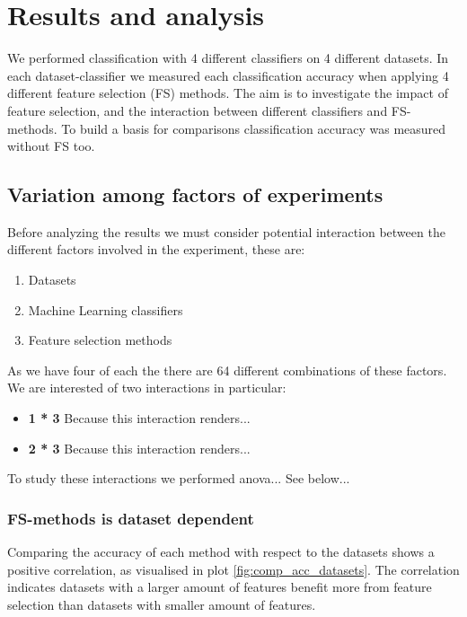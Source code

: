 \chapter{Results and analysis}

We performed classification with 4 different classifiers on 4 different datasets. In each dataset-classifier we measured each classification accuracy when applying 4 different feature selection (FS) methods. The aim is to investigate the impact of feature selection, and the interaction between different classifiers and FS-methods. To build a basis for comparisons classification accuracy was measured without FS too.

\section{Variation among factors of experiments}
\label{Variation_among_factors}

Before analyzing the results we must consider potential interaction between the different factors involved in the experiment, these are:

\begin{enumerate}
  \item Datasets
  \item Machine Learning classifiers
  \item Feature selection methods
\end{enumerate}

As we have four of each the there are 64 different combinations of these factors. We are interested of two interactions in particular:

\begin{itemize}
  \item \textbf{1 * 3} Because this interaction renders...
  \item \textbf{2 * 3} Because this interaction renders...
\end{itemize}

To study these interactions we performed anova... See below...

\subsection{FS-methods is dataset dependent}

Comparing the accuracy of each method with respect to the datasets shows a positive correlation, as visualised in plot \ref{fig:comp_acc_datasets}. The correlation indicates datasets with a larger amount of features benefit more from feature selection than datasets with smaller amount of features.

